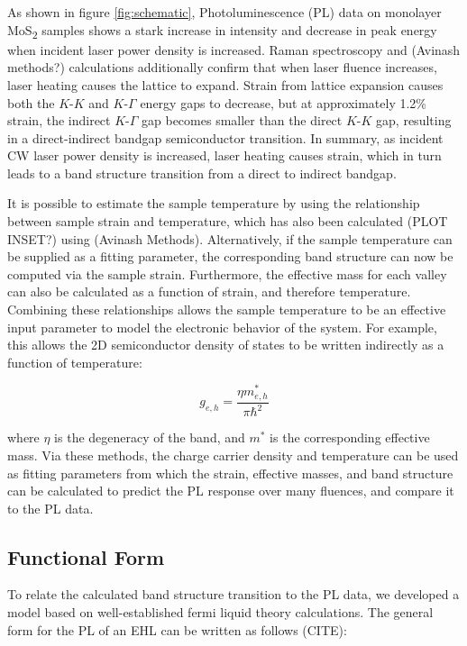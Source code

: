 \documentclass[aps,prl,preprint,superscriptaddress]{revtex4-2}
\begin{document}
As shown in figure \ref{fig:schematic}, Photoluminescence (PL) data on monolayer MoS\textsubscript{2} samples shows a stark increase in intensity and decrease in peak energy when incident laser power density is increased. Raman spectroscopy and (Avinash methods?) calculations additionally confirm that when laser fluence increases, laser heating causes the lattice to expand. Strain from lattice expansion causes both the $K$-$K$ and $K$-$\Gamma$ energy gaps to decrease, but at approximately 1.2\% strain, the indirect $K$-$\Gamma$ gap becomes smaller than the direct $K$-$K$ gap, resulting in a direct-indirect bandgap semiconductor transition. In summary, as incident CW laser power density is increased, laser heating causes strain, which in turn leads to a band structure transition from a direct to indirect bandgap.

It is possible to estimate the sample temperature by using the relationship between sample strain and temperature, which has also been calculated (PLOT INSET?) using (Avinash Methods). Alternatively, if the sample temperature can be supplied as a fitting parameter, the corresponding band structure can now be computed via the sample strain. Furthermore, the effective mass for each valley can also be calculated as a function of strain, and therefore temperature. Combining these relationships allows the sample temperature to be an effective input parameter to model the electronic behavior of the system. For example, this allows the 2D semiconductor density of states to be written indirectly as a function of temperature:

\begin{equation} \label{2D density of states}
g_{e,h} = \frac{\eta m_{e,h}^*}{\pi \hbar^2}
\end{equation}

where $\eta$ is the degeneracy of the band, and $m^*$ is the corresponding effective mass. Via these methods, the charge carrier density and temperature can be used as fitting parameters from which the strain, effective masses, and band structure can be calculated to predict the PL response over many fluences, and compare it to the PL data.

\subsection{Functional Form}

To relate the calculated band structure transition to the PL data, we developed a model based on well-established fermi liquid theory calculations. The general form for the PL of an EHL can be written as follows (CITE):
\end{document}
